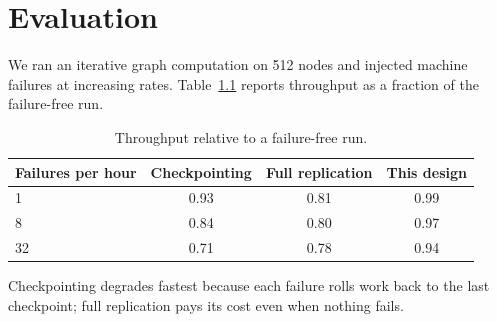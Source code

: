 \chapter{Evaluation}
\label{ch:evaluation}

We ran an iterative graph computation on 512 nodes and injected machine failures at increasing
rates. Table~\ref{tab:throughput} reports throughput as a fraction of the failure-free run.

\begin{table}[htbp]
  \centering
  \caption{Throughput relative to a failure-free run.}
  \label{tab:throughput}
  \begin{tabular}{lccc}
    \toprule
    Failures per hour & Checkpointing & Full replication & This design \\
    \midrule
    1  & 0.93 & 0.81 & 0.99 \\
    8  & 0.84 & 0.80 & 0.97 \\
    32 & 0.71 & 0.78 & 0.94 \\
    \bottomrule
  \end{tabular}
\end{table}

Checkpointing degrades fastest because each failure rolls work back to the last checkpoint;
full replication pays its cost even when nothing fails.
